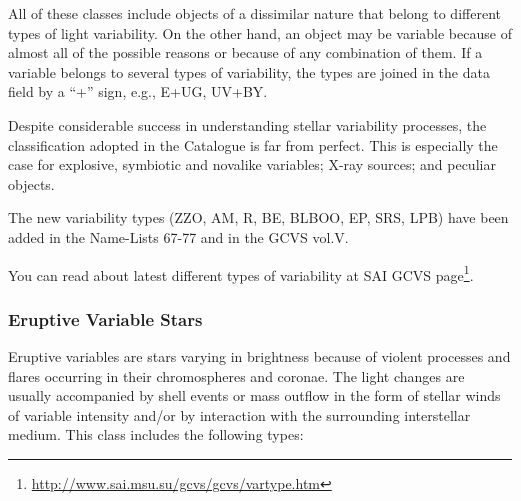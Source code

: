 All of these classes include objects of a dissimilar nature that belong
to different types of light variability. On the other hand, an object
may be variable because of almost all of the possible reasons or because
of any combination of them. If a variable belongs to several types of
variability, the types are joined in the data field by a ``+'' sign, e.g.,
E+UG, UV+BY.

Despite considerable success in understanding stellar variability
processes, the classification adopted in the Catalogue is far from
perfect. This is especially the case for explosive, symbiotic and
novalike variables; X-ray sources; and peculiar objects.

The new variability types (ZZO, AM, R, BE, BLBOO, EP, SRS, LPB) have been 
added in the Name-Lists 67-77 and in the GCVS vol.V.

You can read about latest different types of variability at SAI GCVS page\footnote{
\url{http://www.sai.msu.su/gcvs/gcvs/vartype.htm}}.

\subsubsection{Eruptive Variable Stars}\label{eruptive-variable-stars}

Eruptive variables are stars varying in brightness because of violent
processes and flares occurring in their chromospheres and coronae. The
light changes are usually accompanied by shell events or mass outflow in
the form of stellar winds of variable intensity and/or by interaction
with the surrounding interstellar medium. This class includes the
following types:

